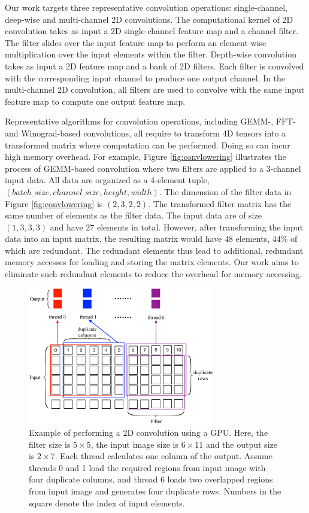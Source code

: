 Our work targets three representative convolution operations: single-channel, deep-wise and multi-channel 2D convolutions. The
computational kernel of 2D convolution takes as input a 2D single-channel feature map and a channel filter. The filter slides over the
input feature map to perform an element-wise multiplication over the input elements within the filter. Depth-wise convolution takes as
input a 2D feature map and a bank of 2D filters. Each filter is convolved with the corresponding input channel to produce one output
channel. In the multi-channel 2D convolution, all filters are used to convolve with the same input feature map to compute one output
feature map.



Representative algorithms for convolution operations, including GEMM-, FFT- and Winograd-based convolutions, all require to transform 4D
tensors into a transformed matrix where computation can be performed. Doing so can incur high memory overhead. For example, Figure
\ref{fig:convlowering} illustrates the process of GEMM-based convolution where two filters are applied to a 3-channel input data. All data
are organized as a 4-element tuple, $(batch\_size, channel\_size, height, width)$. The dimension of the filter data in Figure
\ref{fig:convlowering} is $(2, 3, 2, 2)$. The transformed filter matrix has the same number of elements as the filter data. The input data
are of size $(1, 3, 3, 3)$ and have 27 elements in total. However, after transforming the input data into an input matrix, the resulting
matrix would have 48 elements, 44\% of which are redundant. The redundant elements thus lead to additional, redundant memory accesses for
loading and storing the matrix elements. Our work aims to eliminate such redundant elements to reduce the overhead for memory accessing.


\begin{figure}[t!]
\centering
  \includegraphics[width=\columnwidth,height=6cm]{./figure/twostrategies.eps}
  \caption{Example of performing a 2D convolution using a GPU. Here, the filter size is $5 \times 5$, the input image size is $6 \times 11$
  and the output size is $2 \times 7$. Each thread calculates one column of the output. Assume threads 0 and 1 load the required regions from input
  image with four duplicate columns, and thread 6 loads two overlapped regions from input image and generates four duplicate rows. Numbers in
  the square denote the index of input elements.}
  \label{fig:twostrategies}
\end{figure}
